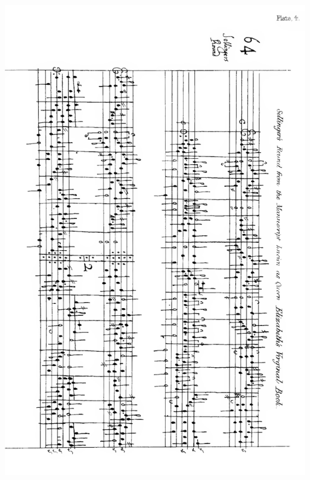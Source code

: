 \thispagestyle{empty}
\noindent\includegraphics*[width=\textwidth]{images/Plate4X.pdf}
\pagebreak
 

